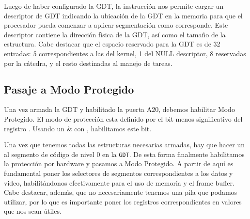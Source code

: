 Luego de haber configurado la GDT, la instrucción  nos permite cargar un descriptor de GDT indicando la ubicación de la GDT en la memoria para que el procesador pueda comenzar a aplicar segmentación como corresponde. Este descriptor contiene la dirección física de la GDT, así como el tamaño de la estructura. Cabe destacar que el espacio reservado para la GDT es de 32 entradas: 5 correspondientes a las del kernel, 1 del NULL descriptor, 8 reservadas por la cátedra, y el resto destinadas al manejo de tareas.

\subsection{Pasaje a Modo Protegido}

Una vez armada la GDT y habilitado la puerta A20, debemos habilitar Modo Protegido. El modo de protección esta definido por el bit menos significativo del registro . Usando un \& con , habilitamos este bit.

Una vez que tenemos todas las estructuras necesarias armadas, hay que hacer un  al segmento de código de nivel 0 en la \texttt{GDT}. De esta forma finalmente habilitamos la protección por hardware y pasamos a Modo Protegido. A partir de aquí es fundamental poner los selectores de segmentos correspondientes a los datos y video, habilitándonos efectivamente para el uso de memoria y el frame buffer. Cabe destacar, además, que no necesariamente tenemos una pila que podamos utilizar, por lo que es importante poner los registros correspondientes en valores que nos sean útiles.